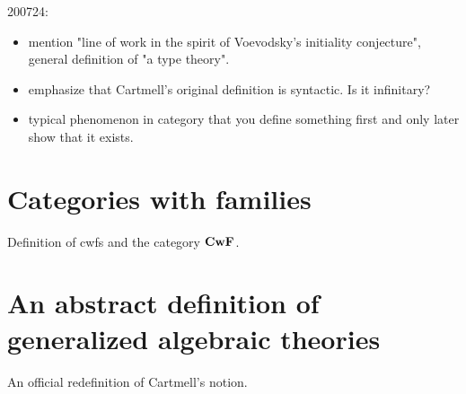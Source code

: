 \documentclass{lmcs}
\begin{document}
200724: 
\begin{itemize}
\item mention "line of work in the spirit of Voevodsky's initiality conjecture", general definition of "a type theory".
\item emphasize that Cartmell's original definition is syntactic. Is it infinitary?
\item typical phenomenon in category that you define something first and only later show that it exists.
\end{itemize}

\section{Categories with families}

Definition of cwfs and the category $\textbf{CwF}$.

\section{An abstract definition of generalized algebraic theories}

An official redefinition of Cartmell's notion. 
\end{document}
